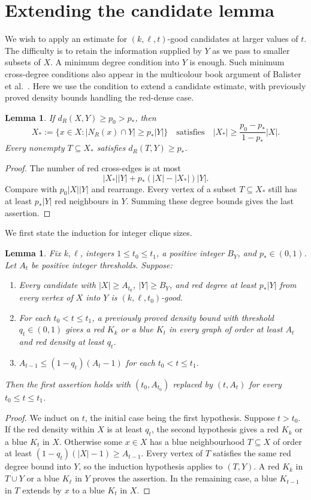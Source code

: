 \documentclass[11pt]{article}
\newtheorem{lemma}[theorem]{Lemma}
\theoremstyle{definition}
\theoremstyle{remark}
\numberwithin{equation}{section}
\begin{document}
\section{Extending the candidate lemma}\label{sec:continuation}

We wish to apply an estimate for $(k,\ell,t)$-good candidates at larger
values of $t$. The difficulty is to retain the information supplied by
$Y$ as we pass to smaller subsets of $X$. A minimum degree condition
into $Y$ is enough. Such minimum cross-degree conditions
also appear in the multicolour book argument of
Balister et al.~\cite{Multicolour}. Here we use the condition to extend
a candidate estimate, with previously proved density bounds handling
the red-dense case.

\begin{lemma}\label{lem:rows}
If $d_R(X,Y)\ge p_0>p_*$, then
\[
 X_*:=\{x\in X:|N_R(x)\cap Y|\ge p_*|Y|\}
 \quad\text{satisfies}\quad
 |X_*|\ge\frac{p_0-p_*}{1-p_*}|X|.
\]
Every nonempty $T\subseteq X_*$ satisfies $d_R(T,Y)\ge p_*$.
\end{lemma}
\begin{proof}
The number of red cross-edges is at most
\[
 |X_*||Y|+p_*(|X|-|X_*|)|Y|.
\]
Compare with $p_0|X||Y|$ and rearrange. Every vertex of a subset $T\subseteq X_*$ still has at least
$p_*|Y|$ red neighbours in $Y$. Summing these degree bounds gives the
last assertion.
\end{proof}

We first state the induction for integer clique sizes.

\begin{lemma}\label{lem:finite-continuation}
Fix $k,\ell$, integers $1\le t_0\le t_1$, a positive integer $B_Y$, and $p_*\in(0,1)$. Let $A_t$ be positive integer thresholds. Suppose:
\begin{enumerate}
\item Every candidate with $|X|\ge A_{t_0}$, $|Y|\ge B_Y$, and red degree at least $p_*|Y|$ from every vertex of $X$ into $Y$ is $(k,\ell,t_0)$-good.
\item For each $t_0<t\le t_1$, a previously proved density bound with threshold $q_t\in(0,1)$ gives a red $K_k$ or a blue $K_t$ in every graph of order at least $A_t$ and red density at least $q_t$.
\item $A_{t-1}\le(1-q_t)(A_t-1)$ for each $t_0<t\le t_1$.
\end{enumerate}
Then the first assertion holds with $(t_0,A_{t_0})$ replaced by $(t,A_t)$ for every $t_0\le t\le t_1$.
\end{lemma}
\begin{proof}
We induct on $t$, the initial case being the first hypothesis. Suppose
$t>t_0$. If the red density within $X$ is at least $q_t$, the second
hypothesis gives a red $K_k$ or a blue $K_t$ in $X$. Otherwise some
$x\in X$ has a blue neighbourhood $T\subseteq X$ of order at least
$(1-q_t)(|X|-1)\ge A_{t-1}$. Every vertex of $T$ satisfies the same
red degree bound into $Y$, so the induction hypothesis applies to
$(T,Y)$. A red $K_k$ in $T\cup Y$ or a blue $K_\ell$ in $Y$ proves
the assertion. In the remaining case, a blue $K_{t-1}$ in $T$ extends
by $x$ to a blue $K_t$ in $X$.
\end{proof}
\end{document}

